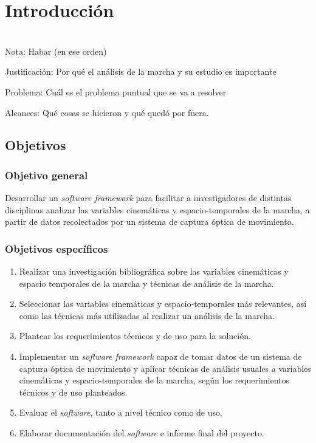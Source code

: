 \chapter{Introducción}

 \\

Nota: Habar (en ese orden) 

Justificación: Por qué el análisis de la marcha y su estudio es importante

Problema: Cuál es el problema puntual que se va a resolver 

Alcances: Qué cosas se hicieron y qué quedó por fuera. 


\section{Objetivos}

\subsection{Objetivo general}

Desarrollar un \emph{software framework} para facilitar a investigadores de distintas disciplinas analizar las variables cinemáticas y espacio-temporales de la marcha, a partir de datos recolectados por un sistema de captura óptica de movimiento.

\subsection{Objetivos específicos}

\begin{enumerate}
    \item Realizar una investigación bibliográfica sobre las variables cinemáticas y espacio temporales de la marcha y técnicas de análisis de la marcha.
    \item Seleccionar las variables cinemáticas y espacio-temporales más relevantes, así como las técnicas más utilizadas al realizar un análisis de la marcha. 
    \item Plantear los requerimientos técnicos y de uso para la solución. 
    \item Implementar un \emph{software framework} capaz de tomar datos de un sistema de captura óptica de movimiento y aplicar técnicas de análisis usuales a variables cinemáticas y espacio-temporales de la marcha, según los requerimientos técnicos y de uso planteados.
    \item Evaluar el \emph{software}, tanto a nivel técnico como de uso.
    \item Elaborar documentación del \emph{software} e informe final del proyecto.
\end{enumerate}

